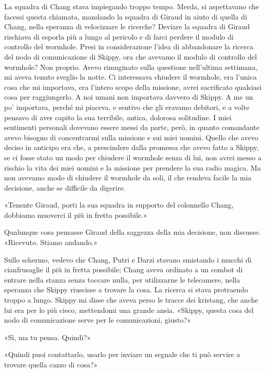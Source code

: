 La squadra di Chang stava impiegando troppo tempo. Merda, si aspettavano
che facessi questa chiamata, mandando la squadra di Giraud in aiuto di
quella di Chang, nella speranza di velocizzare le ricerche? Deviare la
squadra di Giraud rischiava di esporla più a lungo al pericolo e di
farci perdere il modulo di controllo del wormhole. Presi in
considerazione l'idea di abbandonare la ricerca del nodo di
comunicazione di Skippy, ora che avevamo il modulo di controllo del
wormhole? Non proprio. Avevo rimuginato sulla questione nell'ultima
settimana, mi aveva tenuto sveglio la notte. Ci interessava chiudere il
wormhole, era l'unica cosa che mi importava, era l'intero scopo della
missione, avrei sacrificato qualsiasi cosa per raggiungerlo. A noi umani
non importava davvero di Skippy. A me un po' importava, perché mi
piaceva, e sentivo che gli eravamo debitori, e a volte pensavo di aver
capito la sua terribile, antica, dolorosa solitudine. I miei sentimenti
personali dovevano essere messi da parte, però, in quanto comandante
avevo bisogno di concentrarmi sulla missione e sui miei uomini. Quello
che avevo deciso in anticipo era che, a prescindere dalla promessa che
avevo fatto a Skippy, se ci fosse stato un modo per chiudere il wormhole
senza di lui, non avrei messo a rischio la vita dei miei uomini e la
missione per prendere la sua radio magica. Ma non avevamo modo di
chiudere il wormhole da soli, il che rendeva facile la mia decisione,
anche se difficile da digerire.

«Tenente Giraud, porti la sua squadra in supporto del colonnello Chang,
dobbiamo muoverci il più in fretta possibile.»

Qualunque cosa pensasse Giraud della saggezza della mia decisione, non
discusse. «Ricevuto. Stiamo andando.»

Sullo schermo, vedevo che Chang, Putri e Darzi stavano smistando i
mucchi di cianfrusaglie il più in fretta possibile; Chang aveva ordinato
a un combot di entrare nella stanza senza toccare nulla, per utilizzarne
le telecamere, nella speranza che Skippy riuscisse a trovare la cosa. La
ricerca si stava protraendo troppo a lungo. Skippy mi disse che aveva
perso le tracce dei kristang, che anche lui era per lo più cieco,
mettendomi una grande ansia. «Skippy, questa cosa del nodo di
comunicazione serve per le comunicazioni, giusto?»

«Sì, ma tu pensa. Quindi?»

«Quindi puoi contattarlo, usarlo per inviare un segnale che ti può
servire a trovare quella cazzo di cosa?»

